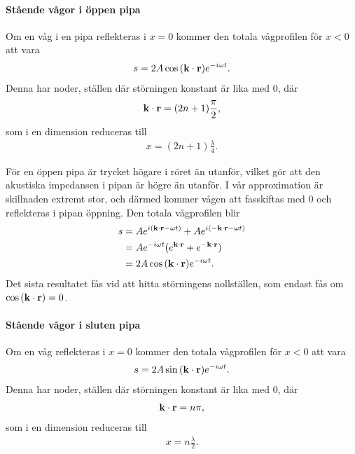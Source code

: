 \deriv

\paragraph{Stående vågor i öppen pipa}
Om en våg i en pipa reflekteras i $x = 0$ kommer den totala vågprofilen för $x < 0$ att vara
\begin{align*}
	s = 2A\cos{(\vect{k}\cdot\vect{r})}e^{-i\omega t}.
\end{align*}
Denna har noder, ställen där störningen konstant är lika med $0$, där
\begin{align*}
	\vect{k}\cdot\vect{r} = (2n + 1)\frac{\pi}{2},
\end{align*}
som i en dimension reduceras till
\begin{align*}
	x = (2n + 1)\frac{\lambda}{4}.
\end{align*}

\deriv
För en öppen pipa är trycket högare i röret än utanför, vilket gör att den akustiska impedansen i pipan är högre än utanför. I vår approximation är skillnaden extremt stor, och därmed kommer vågen att fasskiftas med $0$ och reflekteras i pipan öppning. Den totala vågprofilen blir
\begin{align*}
	s &= Ae^{i(\vect{k}\cdot\vect{r} - \omega t)} + Ae^{i(-\vect{k}\cdot\vect{r} - \omega t)} \\
	  &= Ae^{-i\omega t}(e^{\vect{k}\cdot\vect{r}} + e^{-\vect{k}\cdot\vect{r}}) \\
	  &= 2A\cos{(\vect{k}\cdot\vect{r})}e^{-i\omega t}.
\end{align*}
Det sista resultatet fås vid att hitta störningens nollställen, som endast fås om $\cos{(\vect{k}\cdot\vect{r})} = 0$.

\paragraph{Stående vågor i sluten pipa}
Om en våg reflekteras i $x = 0$ kommer den totala vågprofilen för $x < 0$ att vara
\begin{align*}
	s = 2A\sin{(\vect{k}\cdot\vect{r})}e^{-i\omega t}.
\end{align*}
Denna har noder, ställen där störningen konstant är lika med $0$, där
\begin{align*}
	\vect{k}\cdot\vect{r} = n\pi,
\end{align*}
som i en dimension reduceras till
\begin{align*}
	x = n\frac{\lambda}{2}.
\end{align*}

